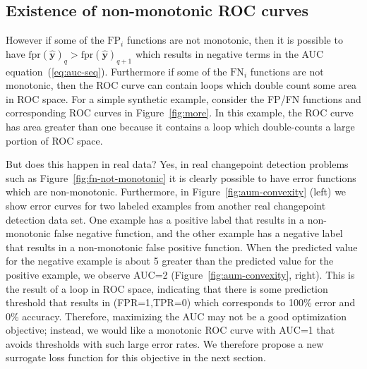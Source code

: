 \documentclass{article}
\begin{document}
\subsection{Existence of non-monotonic ROC curves}

However if some of the $\text{FP}_i$ functions are not monotonic, then it is possible to have $\text{fpr}(\mathbf {\hat y})_{q} > \text{fpr}(\mathbf {\hat y})_{q+1}$ which results in negative terms in the AUC equation~(\ref{eq:auc-seq}). 
Furthermore if some of the $\text{FN}_i$ functions are not monotonic, then the ROC curve can contain loops which double count some area in ROC space.
For a simple synthetic example, consider the FP/FN functions and corresponding ROC curves in Figure~\ref{fig:more}.
In this example, the ROC curve has area greater than one because it contains a loop which double-counts a large portion of ROC space.

But does this happen in real data? Yes, in real changepoint detection problems such as Figure~\ref{fig:fn-not-monotonic} it is clearly possible to have error functions which are non-monotonic.
Furthermore, in Figure~\ref{fig:aum-convexity} (left) we show error curves for two labeled examples from another real changepoint detection data set.
One example has a positive label that results in a non-monotonic false negative function, and the other example has a negative label that results in a non-monotonic false positive function.
When the predicted value for the negative example is about 5 greater than the predicted value for the positive example, we observe AUC=2 (Figure~\ref{fig:aum-convexity}, right).
This is the result of a loop in ROC space, indicating that there is some prediction threshold that results in (FPR=1,TPR=0) which corresponds to 100\% error and 0\% accuracy.
Therefore, maximizing the AUC may not be a good optimization objective; instead, we would like a monotonic ROC curve with AUC=1 that avoids thresholds with such large error rates.
We therefore propose a new surrogate loss function for this objective in the next section.
\end{document}
